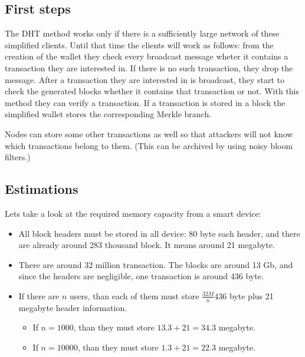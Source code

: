 \documentclass[a4paper,12pt]{article}
\begin{document}
\subsection{First steps}
The DHT method works only if there is a sufficiently large network of these simplified clients. Until that time the clients will work as follows: from the creation of the wallet they check every broadcast message wheter it contains a transaction they are interested in. If there is no such transaction, they drop the message. After a transaction they are interested in is broadcast, they start to check the generated blocks whether it contains that transaction or not. With this method they can verify a transaction. If a transaction is stored in a block the simplified wallet stores the corresponding Merkle branch.

Nodes can store some other transactions as well so that attackers will not know which transactions belong to them. (This can be archived by using noisy bloom filters.)

\subsection{Estimations}\label{number}

Lets take a look at the required memory capacity from a smart device:
\begin{itemize}
	\item All block headers must be stored in all device: 80 byte each header, and there are already around 283 thousand block. It means around 21 megabyte. 
	\item There are around 32 million transaction. The blocks are around 13 Gb, and since the headers are negligible, one transaction is around 436 byte. 
	\item If there are $n$ users, than each of them must store $\frac{32M}{n}436$ byte plus 21 megabyte header information. 
\begin{itemize}
	\item If $n=1000$, than they must store $13.3+21=34.3$ megabyte. 
	\item If $n=10000$, than they must store $1.3+21=22.3$ megabyte. 
\end{itemize}
\end{itemize}
\end{document}
